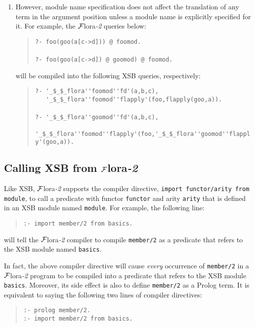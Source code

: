\documentclass[11pt]{article}
\newcommand{\FLORA}{{\mbox{${\cal F}${\sc lora}\rm\emph{-2}}}\xspace}
\begin{document}
\begin{enumerate}
\item However, module name specification does not affect the translation of
      any term in the argument position unless a module name is explicitly
      specified for it. For example, the \FLORA queries below:
      \begin{quote}
      \verb|?- foo(goo(a[c->d])) @ foomod.| \\
      \\
      \verb|?- foo(goo(a[c->d]) @ goomod) @ foomod.|
      \end{quote}
      will be compiled into the following XSB queries, respectively:
      \begin{quote}
      \verb|?- '_$_$_flora''foomod''fd'(a,b,c),| \\
      \verb|   '_$_$_flora''foomod''flapply'(foo,flapply(goo,a)).| \\
      \\
      \verb|?- '_$_$_flora''goomod''fd'(a,b,c),| \\
      \verb|   '_$_$_flora''foomod''flapply'(foo,'_$_$_flora''goomod''flapply'(goo,a)).|
      \end{quote}
\end{enumerate}


\subsection{Calling XSB from \FLORA}


%
Like XSB, \FLORA supports the compiler directive,
\mbox{\tt import functor/arity from module}, to call a predicate
with functor {\tt functor} and arity {\tt arity} that is defined in an
XSB module named {\tt module}. For example, the following line:
\begin{quote}
\verb|:- import member/2 from basics.|
\end{quote}
will tell the \FLORA compiler to compile {\tt member/2} as a predicate
that refers to the XSB module named {\tt basics}.

In fact, the above compiler directive will cause \emph{every}
occurrence of {\tt member/2} in a \FLORA program to be compiled into a
predicate that refers to the XSB module {\tt basics}. Moreover, its
side effect is also to define {\tt member/2} as a Prolog
term. It is equivalent to saying the following two lines of
compiler directives:
\begin{quote}
\begin{verbatim}
:- prolog member/2.
:- import member/2 from basics.
\end{verbatim}
\end{quote}
\end{document}
